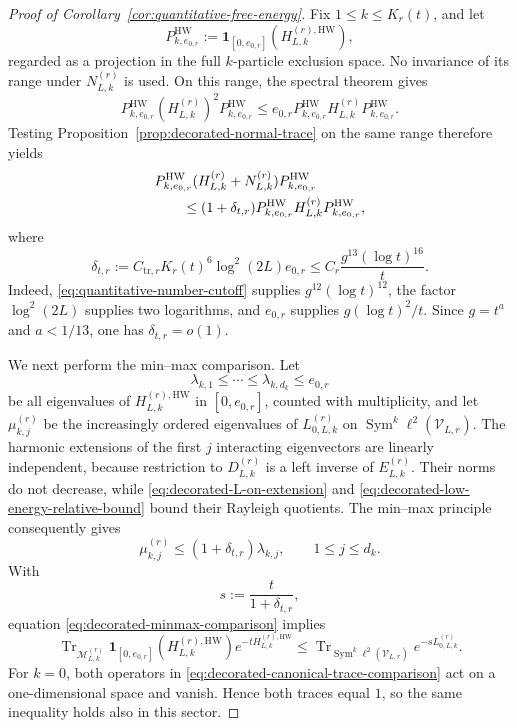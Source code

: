 \documentclass[11pt]{article}
\numberwithin{equation}{section}
\theoremstyle{remark}
\newcommand{\Tr}{\operatorname{Tr}}
\newcommand{\1}{\mathbf 1}
\newcommand{\Sym}{\operatorname{Sym}}
\newcommand{\HW}{\mathrm{HW}}
\begin{document}
\begin{proof}[Proof of Corollary~\ref{cor:quantitative-free-energy}]
Fix \(1\leq k\leq K_r(t)\), and let
\[
 P_{k,e_{0,r}}^{\HW}:=
 \1_{[0,e_{0,r}]}(H_{L,k}^{(r),\HW}),
\]
regarded as a projection in the full \(k\)-particle exclusion space.  No
invariance of its range under \(N_{L,k}^{(r)}\) is used.  On this range,
the spectral theorem gives
\[
 P_{k,e_{0,r}}^{\HW}(H_{L,k}^{(r)})^2P_{k,e_{0,r}}^{\HW}
 \leq e_{0,r}P_{k,e_{0,r}}^{\HW}H_{L,k}^{(r)}P_{k,e_{0,r}}^{\HW}.
\]
Testing Proposition~\ref{prop:decorated-normal-trace} on the same range
therefore yields
\begin{align}
 &P_{k,e_{0,r}}^{\HW}(H_{L,k}^{(r)}+N_{L,k}^{(r)})
 P_{k,e_{0,r}}^{\HW}\notag\\
 &\qquad\leq(1+\delta_{t,r})
 P_{k,e_{0,r}}^{\HW}H_{L,k}^{(r)}P_{k,e_{0,r}}^{\HW},
 \label{eq:decorated-low-energy-relative-bound}
\end{align}
where
\begin{equation}
 \delta_{t,r}:=
 C_{\mathrm{tr},r}K_r(t)^6\log^2(2L)e_{0,r}
 \leq C_r\frac{g^{13}(\log t)^{16}}{t}.
 \label{eq:quantitative-delta}
\end{equation}
Indeed, \eqref{eq:quantitative-number-cutoff} supplies
\(g^{12}(\log t)^{12}\), the factor \(\log^2(2L)\) supplies two
logarithms, and \(e_{0,r}\) supplies \(g(\log t)^2/t\).  Since
\(g=t^a\) and \(a<1/13\), one has \(\delta_{t,r}=o(1)\).

We next perform the min--max comparison.  Let
\[
 \lambda_{k,1}\leq\cdots\leq\lambda_{k,d_k}\leq e_{0,r}
\]
be all eigenvalues of \(H_{L,k}^{(r),\HW}\) in \([0,e_{0,r}]\), counted
with multiplicity, and let \(\mu_{k,j}^{(r)}\) be the increasingly ordered
eigenvalues of \(L_{0,L,k}^{(r)}\) on
\(\Sym^k\ell^2(\mathcal V_{L,r})\).  The harmonic extensions of the first
\(j\) interacting eigenvectors are linearly independent, because
restriction to \(D_{L,k}^{(r)}\) is a left inverse of
\(E_{L,k}^{(r)}\).  Their norms do not decrease, while
\eqref{eq:decorated-L-on-extension} and
\eqref{eq:decorated-low-energy-relative-bound} bound their Rayleigh
quotients.  The min--max principle consequently gives
\begin{equation}
 \mu_{k,j}^{(r)}\leq(1+\delta_{t,r})\lambda_{k,j},
 \qquad 1\leq j\leq d_k.
 \label{eq:decorated-minmax-comparison}
\end{equation}
With
\[
 s:=\frac{t}{1+\delta_{t,r}},
\]
equation \eqref{eq:decorated-minmax-comparison} implies
\begin{equation}
 \Tr_{\mathcal M_{L,k}^{(r)}}
 \1_{[0,e_{0,r}]}(H_{L,k}^{(r),\HW})e^{-tH_{L,k}^{(r),\HW}}
 \leq
 \Tr_{\Sym^k\ell^2(\mathcal V_{L,r})}e^{-sL_{0,L,k}^{(r)}}.
 \label{eq:decorated-canonical-trace-comparison}
\end{equation}
For \(k=0\), both operators in
\eqref{eq:decorated-canonical-trace-comparison} act on a one-dimensional
space and vanish.  Hence both traces equal \(1\), so the same inequality
holds also in this sector.


\end{proof}
\end{document}
